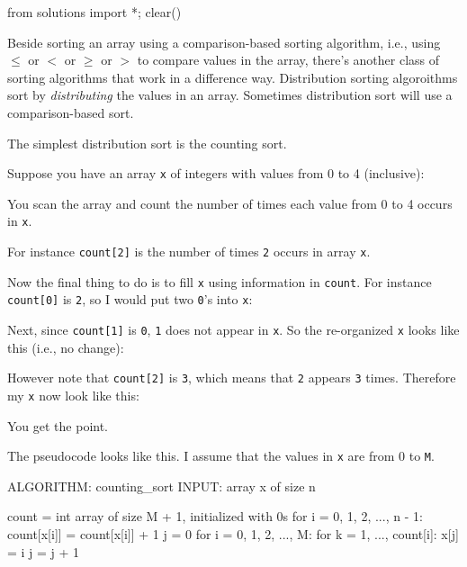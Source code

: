 \begin{python0}
from solutions import *; clear()
\end{python0}

Beside sorting an array using a comparison-based sorting
algorithm, i.e., using $\leq$ or $<$ or $\geq$ or $>$ to compare values in the array,
there's
another class of sorting algorithms that work in a difference way.
Distribution sorting algoroithms sort by \textit{distributing}
the values in an array.
Sometimes distribution sort will use a comparison-based sort.

The simplest distribution sort is the counting sort.

Suppose you have an array \verb!x! of integers with values
from 0 to 4 (inclusive):



You scan the array and count the number of times each value
from 0 to 4 occurs in \verb!x!.



For instance \verb!count[2]! is the number of times \verb!2!
occurs in array \verb!x!.

Now the final thing to do is to fill \verb!x! using
information in \verb!count!.
For instance \verb!count[0]! is \verb!2!, 
so I would put two \verb!0!'s into \verb!x!:



Next, since \verb!count[1]! is \verb!0!, \verb!1! does not appear in 
\verb!x!.
So the re-organized \verb!x! looks like this (i.e., no change):



However note that \verb!count[2]! is \verb!3!, which means that
\verb!2! appears \verb!3! times.
Therefore my \verb!x! now look like this:



You get the point.

The pseudocode looks like this.
I assume that the values in \verb!x! are from 0 to \verb!M!.
\begin{console}
ALGORITHM: counting_sort
INPUT: array x of size n

    count = int array of size M + 1, initialized with 0s
    for i = 0, 1, 2, ..., n - 1:
        count[x[i]] = count[x[i]] + 1
    j = 0
    for i = 0, 1, 2, ..., M:
        for k = 1, ..., count[i]:
            x[j] = i
            j = j + 1
\end{console}


